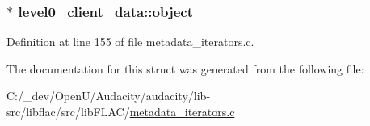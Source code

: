 \subsubsection[{\texorpdfstring{object}{object}}]{$\ast$ level0\+\_\+client\+\_\+data\+::object}\hypertarget{structlevel0__client__data_aed2441efef24194cfbf70399a6f16c58}{}\label{structlevel0__client__data_aed2441efef24194cfbf70399a6f16c58}


Definition at line 155 of file metadata\+\_\+iterators.\+c.



The documentation for this struct was generated from the following file\+:\begin{DoxyCompactItemize}
\item 
C\+:/\+\_\+dev/\+Open\+U/\+Audacity/audacity/lib-\/src/libflac/src/lib\+F\+L\+A\+C/\hyperlink{metadata__iterators_8c}{metadata\+\_\+iterators.\+c}\end{DoxyCompactItemize}

